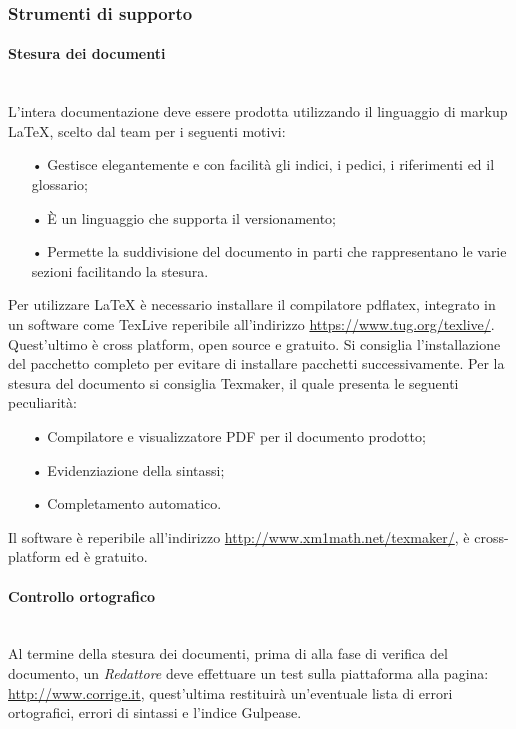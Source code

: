 \subsubsection{Strumenti di supporto} 

\paragraph{Stesura dei documenti}\mbox{}\\
L'intera documentazione deve essere prodotta utilizzando il {linguaggio di markup} \LaTeX{}, scelto dal team per i seguenti motivi:
\begin{itemize}
\item[•] Gestisce elegantemente e con facilità gli indici, i pedici, i riferimenti ed il glossario;
\item[•] È un linguaggio che supporta il {versionamento};
\item[•] Permette la suddivisione del documento in parti che rappresentano le varie sezioni facilitando la stesura.
\end{itemize}
Per utilizzare \LaTeX{} è necessario installare il compilatore pdflatex, integrato in un software come TexLive reperibile all'indirizzo  \url{https://www.tug.org/texlive/}. Quest'ultimo è {cross platform}, {open source} e gratuito. Si consiglia l'installazione del pacchetto completo per evitare di installare pacchetti successivamente.
Per la stesura del documento si consiglia Texmaker, il quale presenta le seguenti peculiarità:
\begin{itemize}
	\item[•] Compilatore e visualizzatore {PDF} per il documento prodotto;
	\item[•] Evidenziazione della sintassi;
	\item[•] Completamento automatico.
\end{itemize}  
Il software è reperibile all'indirizzo \url{http://www.xm1math.net/texmaker/}, è cross-platform ed è gratuito.

\paragraph{Controllo ortografico}\mbox{}\\
Al termine della stesura dei documenti, prima di alla fase di verifica del documento, un \textit{Redattore} deve effettuare un test sulla piattaforma alla pagina: \url{ http://www.corrige.it}, quest’ultima restituirà un’eventuale lista di errori ortografici, errori di sintassi e l’indice {Gulpease}.


